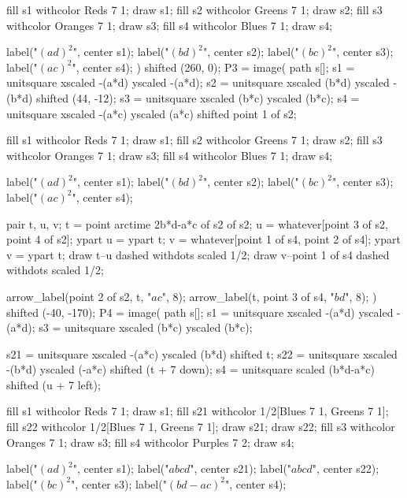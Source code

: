 \documentclass[oneside]{scrbook}
\begin{document}
    fill s1 withcolor Reds 7 1;     draw s1;
    fill s2 withcolor Greens 7 1;   draw s2;
    fill s3 withcolor Oranges 7 1;  draw s3;
    fill s4 withcolor Blues 7 1;    draw s4;

    label("$\left(ad\right)^2$", center s1);  
    label("$\left(bd\right)^2$", center s2);  
    label("$\left(bc\right)^2$", center s3);  
    label("$\left(ac\right)^2$", center s4);  
) shifted (260, 0);
P3 = image(
    path s[];
    s1 = unitsquare xscaled -(a*d) yscaled -(a*d);
    s2 = unitsquare xscaled  (b*d) yscaled -(b*d) shifted (44, -12);
    s3 = unitsquare xscaled  (b*c) yscaled (b*c);
    s4 = unitsquare xscaled -(a*c) yscaled (a*c) shifted point 1 of s2;
                             
    fill s1 withcolor Reds 7 1;     draw s1;
    fill s2 withcolor Greens 7 1;   draw s2;
    fill s3 withcolor Oranges 7 1;  draw s3;
    fill s4 withcolor Blues 7 1;    draw s4;

    label("$\left(ad\right)^2$", center s1);  
    label("$\left(bd\right)^2$", center s2);  
    label("$\left(bc\right)^2$", center s3);  
    label("$\left(ac\right)^2$", center s4);  
    
    pair t, u, v; 
    t = point arctime 2b*d-a*c of s2 of s2;
    u = whatever[point 3 of s2, point 4 of s2]; ypart u = ypart t;
    v = whatever[point 1 of s4, point 2 of s4]; ypart v = ypart t;
    draw t--u dashed withdots scaled 1/2;
    draw v--point 1 of s4 dashed withdots scaled 1/2;

    arrow_label(point 2 of s2, t, "$ac$", 8);
    arrow_label(t, point 3 of s4, "$bd$", 8);
) shifted (-40, -170);
P4 = image(
    path s[];
    s1 = unitsquare xscaled -(a*d) yscaled -(a*d);
    s3 = unitsquare xscaled  (b*c) yscaled (b*c);

    s21 = unitsquare xscaled -(a*c) yscaled (b*d) shifted t;
    s22 = unitsquare xscaled -(b*d) yscaled (-a*c) shifted (t + 7 down);
    s4 = unitsquare scaled (b*d-a*c) shifted (u + 7 left);
                             
    fill s1 withcolor Reds 7 1;     draw s1;
    fill s21 withcolor 1/2[Blues 7 1, Greens 7 1];   
    fill s22 withcolor 1/2[Blues 7 1, Greens 7 1];   
    draw s21; draw s22;
    fill s3 withcolor Oranges 7 1;  draw s3;
    fill s4 withcolor Purples 7 2;    draw s4;

    label("$\left(ad\right)^2$", center s1);  
    label("$abcd$", center s21);  
    label("$abcd$", center s22);  
    label("$\left(bc\right)^2$", center s3);  
    label("$\scriptstyle \left(bd-ac\right)^2$", center s4);  
\end{document}
